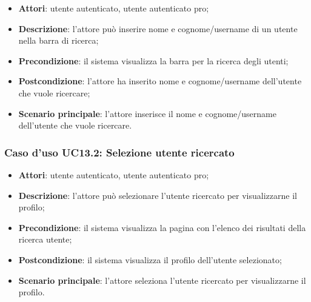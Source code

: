 \begin{itemize}
	\item \textbf{Attori}: utente autenticato, utente autenticato pro;
	\item \textbf{Descrizione}: l'attore può inserire nome e cognome/username di un utente nella barra di ricerca;
	\item \textbf{Precondizione}: il sistema visualizza la barra per la ricerca degli utenti;
	\item \textbf{Postcondizione}: l'attore ha inserito nome e cognome/username dell'utente che vuole ricercare;
	\item \textbf{Scenario principale}: l'attore inserisce il nome e cognome/username dell'utente che vuole ricercare.
\end{itemize}

\subsubsection{Caso d'uso UC13.2: Selezione utente ricercato}

\begin{itemize}
	\item \textbf{Attori}: utente autenticato, utente autenticato pro;
	\item \textbf{Descrizione}: l'attore può selezionare l'utente ricercato per visualizzarne il profilo;
	\item \textbf{Precondizione}: il sistema visualizza la pagina con l'elenco dei risultati della ricerca utente;
	\item \textbf{Postcondizione}: il sistema visualizza il profilo dell'utente selezionato;
	\item \textbf{Scenario principale}: l'attore seleziona l'utente ricercato per visualizzarne il profilo.
\end{itemize}

